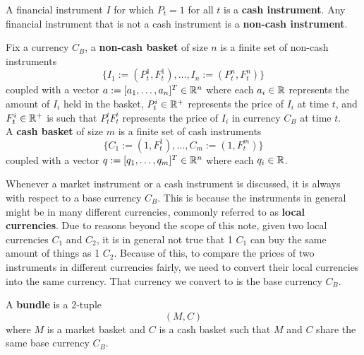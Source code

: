 \documentclass[11pt,fleqn]{book} %
\begin{document}
\begin{definition} \label{def:113}
A financial instrument \(I\) for which \(P_t = 1\) for all \(t\) is a \textbf{cash instrument}. Any financial
instrument that is not a cash instrument is a \textbf{non-cash instrument}.
\end{definition}

\begin{definition} \label{def:114}
Fix a currency \(C_B\), a \textbf{non-cash basket} of size \(n\) is a finite set of non-cash instruments
\[
\{I_1 := (P^1_t, F^1_t), \ldots, I_n := (P_t^n, F_t^n)\}
\]
coupled with a vector \(a := [a_1, \ldots, a_n]^T \in \mathbb{R}^n\) where each \(a_i \in \mathbb{R}\) represents the amount of 
\(I_i\) held in the basket, \(P_t^i \in \mathbb{R}^+\) represents the price of \(I_i\) at time \(t\), and \(F_t^i \in \mathbb{R}^+\) is 
such that \(P_t^iF_t^i\) represents the price of \(I_i\) in currency \(C_B\) at time \(t\).\\
A \textbf{cash basket} of size \(m\) is a finite set of cash instruments
\[
\{C_1 := (1, F_t^1), \ldots, C_m := (1, F_t^m)\}
\]
coupled with a vector \(q := [q_1, \ldots, q_m]^T \in \mathbb{R}^n\) where each \(q_i \in \mathbb{R}\). 
\end{definition}

\begin{remark} \label{rmk:115}
Whenever a market instrument or a cash instrument is discussed, it is always with respect to a base currency \(C_B\). This is because the instruments in general might
be in many different currencies, commonly referred to as \textbf{local currencies}. Due to reasons beyond the scope of this note, given two local currencies \(C_1\) 
and \(C_2\), it is in general not true that 1 \(C_1\) can buy the same amount of things as 1 \(C_2\). Because of this, to compare the prices of two instruments in different
currencies fairly, we need to convert their local currencies into the same currency. That currency we convert to is the base currency \(C_B\).
\end{remark}

\begin{definition} \label{def:116}
A \textbf{bundle} is a 2-tuple
\[
(M, C)
\]
where \(M\) is a market basket and \(C\) is a cash basket such that \(M\) and \(C\) share the same base currency \(C_B\).
\end{definition}

\end{document}
